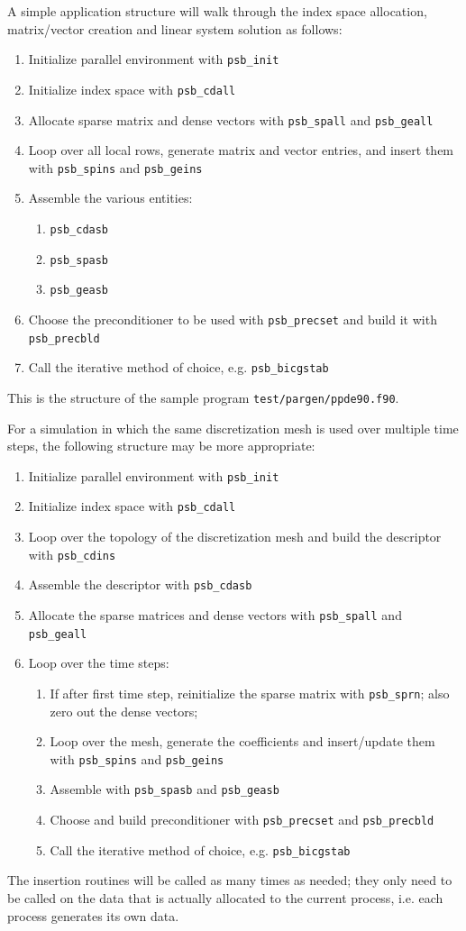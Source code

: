 A simple application structure will walk through the index space
allocation, matrix/vector creation and linear system solution as
follows:
\begin{enumerate}
\item Initialize parallel environment with \verb|psb_init|
\item Initialize index space with \verb|psb_cdall|
\item Allocate sparse matrix and dense vectors with \verb|psb_spall|
  and \verb|psb_geall|
\item Loop over all local rows, generate matrix and vector entries,
  and insert them with \verb|psb_spins| and \verb|psb_geins|
\item Assemble the various entities: 
\begin{enumerate}
\item \verb|psb_cdasb|
\item \verb|psb_spasb|
\item \verb|psb_geasb|
\end{enumerate}
\item Choose the preconditioner to be used with \verb|psb_precset| and
  build it with \verb|psb_precbld|
\item Call the iterative method of choice, e.g. \verb|psb_bicgstab|
\end{enumerate}
This is the structure of the sample program
\verb|test/pargen/ppde90.f90|. 

For a simulation in which the same discretization mesh is used over
multiple time steps, the following structure may be more appropriate:
\begin{enumerate}
\item Initialize parallel environment with \verb|psb_init|
\item Initialize index space with \verb|psb_cdall|
\item Loop over the topology of the discretization mesh and build the
  descriptor with \verb|psb_cdins|
\item Assemble the descriptor with \verb|psb_cdasb|
\item Allocate the sparse matrices and dense vectors with
  \verb|psb_spall| and \verb|psb_geall|
\item Loop over the time steps: 
\begin{enumerate}
\item If after first time step, 
  reinitialize the sparse matrix with \verb|psb_sprn|; also zero out
  the dense vectors;
\item Loop over the mesh, generate the coefficients and insert/update
  them with \verb|psb_spins| and \verb|psb_geins|
\item Assemble with \verb|psb_spasb| and \verb|psb_geasb|
\item Choose and build preconditioner with \verb|psb_precset| and
  \verb|psb_precbld|
\item Call the iterative method of choice, e.g. \verb|psb_bicgstab|
 \end{enumerate}
\end{enumerate}
The insertion routines will be called as many times as needed; 
they only need to  be called on the data that is actually
allocated to the current process, i.e. each process generates its own
data. 

